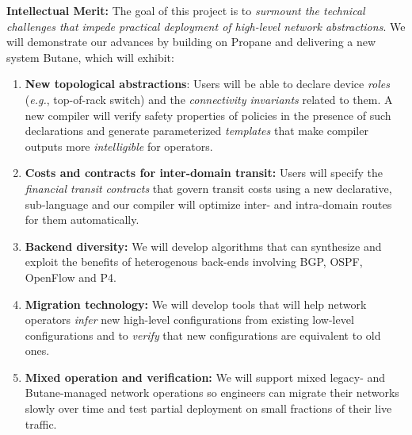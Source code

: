 \documentclass[12pt]{article}
\makeatletter
\newcommand{\Propane}{{\sc Propane}\@\xspace}
\newcommand{\Name}{{\sc Butane}\@\xspace}
\makeatother
\begin{document}
\noindent
\textbf{Intellectual Merit:} 
The goal of this project is to 
{\em surmount the technical challenges that impede practical 
deployment of high-level network abstractions}.  We will demonstrate
our advances by building on \Propane and delivering a new system \Name, which
will exhibit:  
\begin{enumerate}
\item {\bf New topological abstractions}:  Users will be able to declare device 
\emph{roles} (\emph{e.g.}, top-of-rack switch)
and the \emph{connectivity invariants} related to them.  A new compiler
will verify safety properties of policies in the presence of such 
declarations and generate parameterized \emph{templates}
that make compiler outputs more \emph{intelligible} for operators.  
\item {\bf Costs and contracts for inter-domain transit:}
Users will specify the 
\emph{financial transit contracts} that govern transit
costs using a new declarative, sub-language and our compiler will
optimize inter- and intra-domain routes for them automatically.
\item {\bf Backend diversity:}  We will develop algorithms that
can synthesize and exploit the benefits of heterogenous back-ends 
involving BGP, OSPF, OpenFlow and P4.
\item {\bf Migration technology:} We will develop
tools that will help network operators \emph{infer} 
new high-level configurations from existing low-level configurations
and to \emph{verify} that new configurations are equivalent to old ones.
\item {\bf Mixed operation and verification:} We will support mixed
legacy- and \Name-managed network operations so engineers can
migrate their networks slowly over time and test partial deployment on
small fractions of their live traffic.
\end{enumerate}
\end{document}
